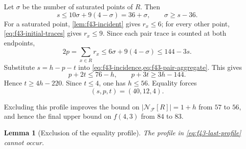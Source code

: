 \documentclass[11pt]{article}
\numberwithin{equation}{section}
\newtheorem{lemma}[lemma]{Lemma}
\theoremstyle{definition}
\theoremstyle{remark}
\newcommand{\F}{\mathcal F}
\begin{document}
Let $\sigma$ be the number of saturated points of $R$. Then
\[
 s\le10\sigma+9(4-\sigma)=36+\sigma,
 \qquad \sigma\ge s-36.
\]
For a saturated point, \cref{lem:f43-incident} gives $r_x\le6$; for every
other point, \cref{eq:f43-initial-traces} gives $r_x\le9$. Since each pair
trace is counted at both endpoints,
\begin{equation}
 2p=\sum_{x\in R}r_x
 \le6\sigma+9(4-\sigma)
 \le144-3s.
 \label{eq:f43-pair-aggregate}
\end{equation}
Substitute $s=h-p-t$ into
\cref{eq:f43-incidence,eq:f43-pair-aggregate}. This gives
\[
 p+2t\le76-h,
 \qquad
 p+3t\ge3h-144.
\]
Hence $t\ge4h-220$. Since $t\le4$, one has $h\le56$. Equality forces
\begin{equation}
 (s,p,t)=(40,12,4).
 \label{eq:f43-last-profile}
\end{equation}

Excluding this profile improves the bound on
$|\mathcal N_{\F}[R]|=1+h$ from $57$ to $56$, and hence the final upper
bound on $f(4,3)$ from $84$ to $83$.

\begin{lemma}[Exclusion of the equality profile]
\label{lem:f43-last-profile}
The profile in \cref{eq:f43-last-profile} cannot occur.
\end{lemma}
\end{document}
